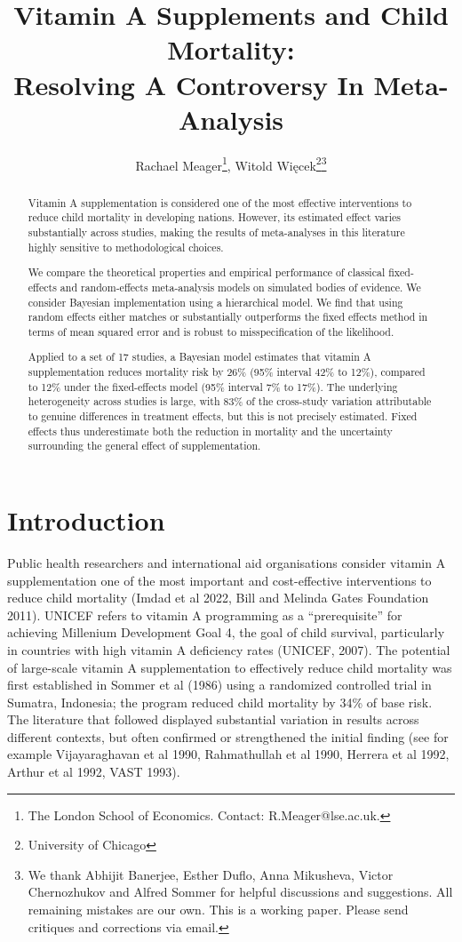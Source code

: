 \documentclass[12pt]{article}
\title{\Large Vitamin A Supplements and Child Mortality:\\ Resolving A Controversy In Meta-Analysis\\
}
\author{Rachael Meager\footnote{The London School of Economics. Contact: R.Meager@lse.ac.uk.}, Witold Więcek\footnote{University of Chicago}\;\thanks{We thank Abhijit Banerjee, Esther Duflo, Anna Mikusheva, Victor Chernozhukov and Alfred Sommer for helpful discussions and suggestions. All remaining mistakes are our own. This is a working paper. Please send critiques and corrections via email.  }}
\begin{document}
\maketitle

\begin{abstract}
Vitamin A supplementation is considered one of the most effective interventions to reduce child mortality in developing nations. However, its estimated effect varies substantially across studies, making the results of meta-analyses in this literature highly sensitive to methodological choices. 

We compare the theoretical properties and empirical performance of classical fixed-effects and  random-effects meta-analysis models on simulated bodies of evidence. We consider Bayesian implementation using a hierarchical model. We find that using random effects either matches or substantially outperforms the fixed effects method in terms of mean squared error and is robust to misspecification of the likelihood. 

Applied to a set of 17 studies, a Bayesian model estimates that vitamin A supplementation reduces mortality risk by 26\% (95\% interval 42\% to 12\%), compared to 12\% under the fixed-effects model (95\% interval 7\% to 17\%). 
The underlying heterogeneity across studies is large, with 83\% of the cross-study variation attributable to genuine differences in treatment effects, but this is not precisely estimated. 
Fixed effects thus underestimate both the reduction in mortality and the uncertainty surrounding the general effect of supplementation. 

\end{abstract}

\section{Introduction}
Public health researchers and international aid organisations consider vitamin A supplementation one of the most important and cost-effective interventions to reduce child mortality (Imdad et al 2022, Bill and Melinda Gates Foundation 2011). UNICEF refers to vitamin A programming as a ``prerequisite'' for achieving Millenium Development Goal 4, the goal of child survival, particularly in countries with high vitamin A deficiency rates (UNICEF, 2007).  The potential of large-scale vitamin A supplementation to effectively reduce child mortality was first established in Sommer et al (1986) using a randomized controlled trial in Sumatra, Indonesia; the program reduced child mortality by 34\% of base risk. The literature that followed displayed substantial variation in results across different contexts, but often confirmed or strengthened the initial finding (see for example Vijayaraghavan et al 1990, Rahmathullah et al 1990, Herrera et al 1992, Arthur et al 1992, VAST 1993). 
\end{document}
